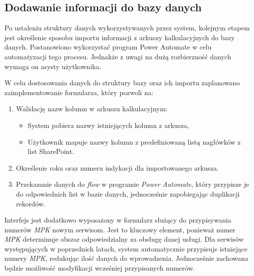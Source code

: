 \subsection{Dodawanie informacji do bazy danych}

Po ustaleniu struktury danych wykorzystywanych przez system, kolejnym etapem jest określenie sposobu importu informacji z arkuszy kalkulacyjnych do bazy danych. Postanowiono wykorzystać program Power Automate w celu automatyzacji tego procesu. Jednakże z uwagi na dużą rozbierzność danych wymaga on asysty użytkownika. 

W celu dostosowania danych do struktury bazy oraz ich importu zaplanowano zaimplementowanie formularza, który pozwoli na:
\begin{enumerate}
    \item Walidację nazw kolumn w arkuszu kalkulacyjnym:
    \begin{itemize}
        \item System pobiera nazwy istniejących kolumn z arkusza,
        \item Użytkownik mapuje nazwy kolumn z predefiniowaną listą nagłówków z list SharePoint.
    \end{itemize}
    \item Określenie roku oraz numeru indykacji dla importowanego arkusza.
    \item Przekazanie danych do \emph{flow} w programie \emph{Power Automate}, który przypisze je do odpowiednich list w bazie danych, jednocześnie zapobiegając duplikacji rekordów.
\end{enumerate}

\begin{comment}
W celu dostosowania danych do struktury bazy, zaplanowano zaimplementowanie formularza walidacyjnego dla nazw kolumn. System pobiera nazwy istniejących kolumn z arkusza i umożliwia ich mapowanie z wykorzystaniem predefiniowanej listy nagłówków z list SharePoint.

Po uporządkowaniu struktury, użytkownik określa rok oraz numer indykacji dla importowanego arkusza. Następnie dane przekazywane są do \emph{flow} w programie \emph{Power Automate}, który przypisze je do odpowiednich list w bazie danych, jednocześnie zapobiegając duplikacji rekordów.
\end{comment}
Interfejs jest dodatkowo wyposażony w formularz służący do przypisywania numerów \emph{MPK} nowym serwisom. Jest to kluczowy element, ponieważ numer \emph{MPK} determinuje obszar odpowiedzialny za obsługę danej usługi. Dla serwisów występujących w poprzednich latach, system automatycznie przypisuje istniejące numery \emph{MPK}, redukując ilość danych do wprowadzenia. Jednocześnie zachowana będzie możliwość modyfikacji wcześniej przypisanych numerów.

